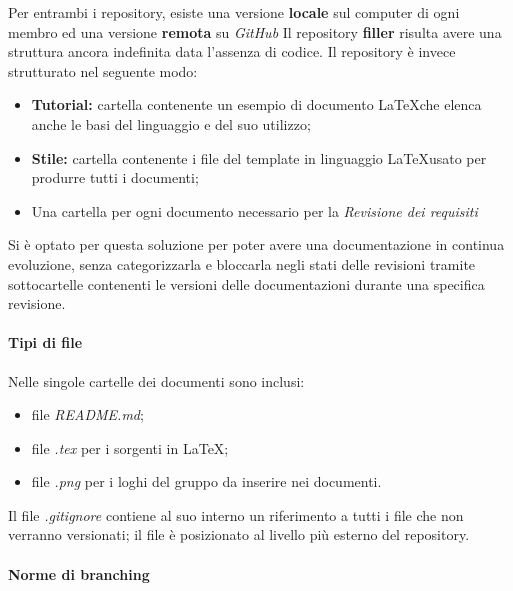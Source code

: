 Per entrambi i repository, esiste una versione \textbf{locale} sul computer di ogni membro ed una versione \textbf{remota} su \textit{GitHub}\newline
Il repository \textbf{filler} risulta avere una struttura ancora indefinita data l'assenza di codice.\newline
Il repository \textbf{\repoDoc} è invece strutturato nel seguente modo:
\begin{itemize}

	\item \textbf{Tutorial:} cartella contenente un esempio di documento \LaTeX che elenca anche le basi del linguaggio e del suo utilizzo; 
	\item \textbf{Stile:} cartella contenente i file del template in linguaggio \LaTeX usato per produrre tutti i documenti;
	\item Una cartella per ogni documento necessario per la \textit{Revisione dei requisiti}

\end{itemize}
Si è optato per questa soluzione per poter avere una documentazione in continua evoluzione, senza categorizzarla e bloccarla negli stati delle revisioni tramite sottocartelle contenenti le versioni delle documentazioni durante una specifica revisione.

\paragraph{Tipi di file}
Nelle singole cartelle dei documenti sono inclusi:
\begin{itemize}
\item file \textit{README.md};
\item file \textit{.tex} per i sorgenti in \LaTeX; 
\item file \textit{.png} per i loghi del gruppo da inserire nei documenti.
\end{itemize}
Il file \textit{.gitignore} contiene al suo interno un riferimento a tutti i file che non verranno versionati; il file è posizionato al livello più esterno del repository.

\paragraph{Norme di branching}
\label{NormeBranching}

